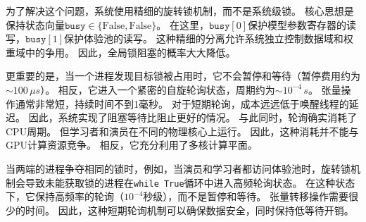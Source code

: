 为了解决这个问题，系统使用精细的旋转锁机制，而不是系统级锁。 核心思想是保持状态向量$\texttt{busy} \in \{\text{False}, \text{False}\}$。 在这里，$\texttt{busy}[0]$保护模型参数寄存器的读写，$\texttt{busy}[1]$保护体验池的读写。 这种精细的分离允许系统独立控制数据域和权重域中的争用。 因此，全局锁阻塞的概率大大降低。

更重要的是，当一个进程发现目标锁被占用时，它不会暂停和等待（暂停费用约为$\sim 100\,\mu s$）。 相反，它进入一个紧密的自旋轮询状态，周期约为$\sim 10^{-4}\,s$。 张量操作通常非常短，持续时间不到1毫秒。 对于短期轮询，成本远远低于唤醒线程的延迟。 因此，系统实现了阻塞等待比阻止更好的情况。 与此同时，轮询确实消耗了CPU周期。 但学习者和演员在不同的物理核心上运行。 因此，这种消耗并不能与GPU计算资源竞争。 相反，它充分利用了多核计算平面。

当两端的进程争夺相同的锁时，例如，当演员和学习者都访问体验池时，旋转锁机制会导致未能获取锁的进程在\texttt{while True}循环中进入高频轮询状态。 在这种状态下，它保持高频率的轮询（$10^{-4}$秒级），而不是暂停和等待。 张量转移操作需要很少的时间。 因此，这种短期轮询机制可以确保数据安全，同时保持低等待开销。

